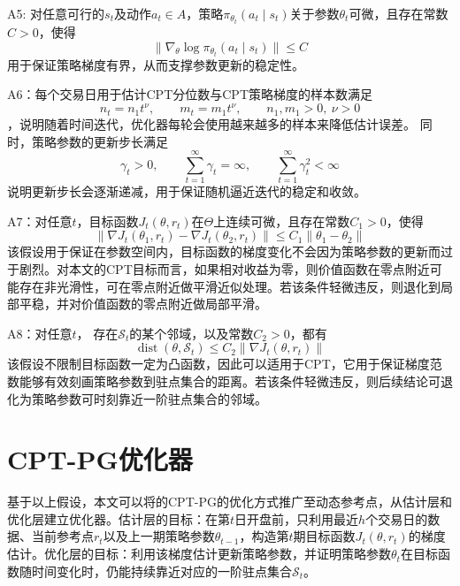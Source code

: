 \documentclass{sufethesismas}
\begin{document}
A5: 对任意可行的$s_t$及动作$a_t \in A$，策略$\pi_{\theta_t}(a_t \mid s_t)$关于参数$\theta_t$可微，且存在常数$C > 0$，使得
\begin{equation}
\|\nabla_{\theta} \log \pi_{\theta_t}(a_t \mid s_t)\| \leq C
\end{equation}
用于保证策略梯度有界，从而支撑参数更新的稳定性。

A6：每个交易日用于估计CPT分位数与CPT策略梯度的样本数满足
\begin{equation}
n_t = n_1 t^\nu,\qquad m_t = m_1 t^\nu,\qquad n_1,m_1>0,\ \nu>0
\end{equation}，说明随着时间迭代，优化器每轮会使用越来越多的样本来降低估计误差。
同时，策略参数的更新步长满足
\begin{equation}
\gamma_t>0,\qquad \sum_{t=1}^{\infty}\gamma_t=\infty,\qquad \sum_{t=1}^{\infty}\gamma_t^2<\infty
\end{equation}
说明更新步长会逐渐递减，用于保证随机逼近迭代的稳定和收敛。

A7：对任意$t$，目标函数$J_t(\theta,r_t)$在$\Theta$上连续可微，且存在常数$C_1>0$，使得
\begin{equation}
\|\nabla J_t(\theta_1,r_t)-\nabla J_t(\theta_2,r_t)\|
\le C_1\|\theta_1-\theta_2\|
\end{equation}
该假设用于保证在参数空间内，目标函数的梯度变化不会因为策略参数的更新而过于剧烈。对本文的CPT目标而言，如果相对收益为零，则价值函数在零点附近可能存在非光滑性，可在零点附近做平滑近似处理。若该条件轻微违反，则退化到局部平稳，并对价值函数的零点附近做局部平滑。

A8：对任意$t$，
存在$\mathcal S_t$的某个邻域，以及常数$C_2>0$，都有
\begin{equation}
\operatorname{dist}(\theta,\mathcal S_t)
\le
C_2\|\nabla J_t(\theta,r_t)\|
\end{equation}
该假设不限制目标函数一定为凸函数，因此可以适用于CPT，它用于保证梯度范数能够有效刻画策略参数到驻点集合的距离。若该条件轻微违反，则后续结论可退化为策略参数可时刻靠近一阶驻点集合的邻域。


\section{CPT-PG优化器}
基于以上假设，本文可以将\cite{Agnelli2017}的CPT-PG的优化方式推广至动态参考点，从估计层和优化层建立优化器。估计层的目标：在第$t$日开盘前，只利用最近$h$个交易日的数据、当前参考点$r_t$以及上一期策略参数$\theta_{t-1}$，构造第$t$期目标函数$J_t(\theta,r_t)$的梯度估计。优化层的目标：利用该梯度估计更新策略参数，并证明策略参数$\theta_t$在目标函数随时间变化时，仍能持续靠近对应的一阶驻点集合$\mathcal{S}_t$。
\end{document}

